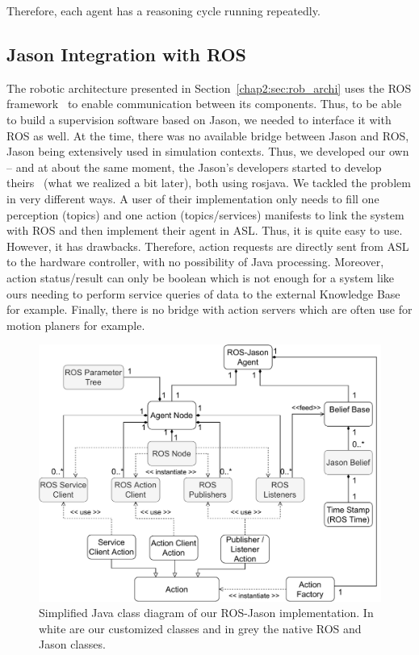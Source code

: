 \documentclass[a4paper,11pt,twoside]{StyleThese}
\begin{document}
Therefore, each agent has a reasoning cycle running repeatedly.

\subsection{Jason Integration with ROS}
The robotic architecture presented in Section~\ref{chap2:sec:rob_archi} uses the ROS framework~\cite{quigley_2009_ros} to enable communication between its components. Thus, to be able to build a supervision software based on Jason, we needed to interface it with ROS as well. At the time, there was no available bridge between Jason and ROS, Jason being extensively used in simulation contexts. Thus, we developed our own -- and at about the same moment, the Jason's developers started to develop theirs~\cite{silva_2020_embedded} (what we realized a bit later), both using rosjava. We tackled the problem in very different ways. A user of their implementation only needs to fill one perception (topics) and one action (topics/services) manifests to link the system with ROS and then implement their agent in ASL. Thus, it is quite easy to use. However, it has drawbacks. Therefore, action requests are directly sent from ASL to the hardware controller, with no possibility of Java processing. Moreover, action status/result can only be boolean which is not enough for a system like ours needing to perform service queries of data to the external Knowledge Base for example. Finally, there is no bridge with action servers which are often use for motion planers for example. 

\begin{figure}[!ht]
	\includegraphics[width=\linewidth]{figures/chapter2/RJS_diagram.pdf}
	\caption{Simplified Java class diagram of our ROS-Jason implementation. In white are our customized classes and in grey the native ROS and Jason classes.}
	\label{chap2:fig:rjs}
\end{figure}
\end{document}
